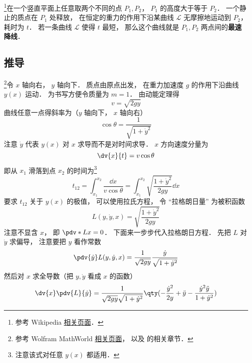 

\footnote{参考 Wikipedia \href{https://en.wikipedia.org/wiki/Brachistochrone_curve}{相关页面}．}在一个竖直平面上任意取两个不同的点 $P_1, P_2$， $P_1$ 的高度大于等于 $P_2$． 一个静止的质点在 $P_1$ 处释放， 在恒定的重力的作用下沿某曲线 $\mathcal L$ 无摩擦地运动到 $P_2$， 耗时为 $t$． 若一条曲线 $\mathcal L$ 使得 $t$ 最短， 那么这个曲线就是 $P_1, P_2$ 两点间的\textbf{最速降线}．

\subsection{推导}
\footnote{参考 Wolfram MathWorld \href{https://mathworld.wolfram.com/BrachistochroneProblem.html}{相关页面}， 以及 \cite{Goldstein} 的相关章节．}令 $x$ 轴向右， $y$ 轴向下． 质点由原点出发， 在重力加速度 $g$ 的作用下沿曲线 $y(x)$ 运动． 为书写方便令质量为 $m = 1$． 由动能定理得
\begin{equation}
v = \sqrt{2gy}
\end{equation}
曲线任意一点得斜率为（$y$ 轴向下， $x$ 轴向右）
\begin{equation}
\cos\theta = \frac{1}{\sqrt{1 + \dot{y}^2}}
\end{equation}
注意 $\dot{y}$ 代表 $y(x)$ 对 $x$ 求导而不是对时间求导． $x$ 方向速度分量为
\begin{equation}
\dv{x}{t} = v\cos\theta
\end{equation}
即从 $x_1$ 滑落到点 $x_2$ 的时间为\footnote{注意该式对任意 $y(x)$ 都适用．}
\begin{equation}\label{Brachi_eq3}
t_{12} = \int_{x_1}^{x_2} \frac{\dd{x}}{v\cos\theta} = \int_{x_1}^{x_2} \sqrt{\frac{1 + \dot{y}^2}{2gy}} \dd{x}
\end{equation}
要求 $t_{12}$ 关于 $y(x)$ 的极值， 可以使用拉氏方程， 令 “拉格朗日量” 为被积函数
\begin{equation}
L(y, \dot y, x) = \sqrt{\frac{1 + \dot{y}^2}{2gy}}
\end{equation}
注意不显含 $x$， 即 $\pdv*{L}{x} = 0$． 下面来一步步代入拉格朗日方程． 先把 $L$ 对 $\dot{y}$ 求偏导， 注意要把 $y$ 看作常数
\begin{equation}
\pdv{\dot{y}}L(y, \dot{y}, x) = \frac{1}{\sqrt{2gy}}\frac{\dot{y}}{\sqrt{1 + \dot{y}^2}}
\end{equation}
然后对 $x$ 求全导数（把 $y, \dot{y}$ 看成 $x$ 的函数）
\begin{equation}
\dv{x}\pdv{L}{\dot{y}} = \frac{1}{\sqrt{2gy}\sqrt{1+\dot y^2}} \qty(-\frac{\dot y^2}{2y} + \ddot y - \frac{\dot y^2 \ddot y}{1 + \dot y^2})
\end{equation}

